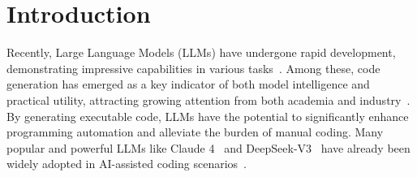 \section{Introduction}
\label{sec:intro}





Recently, Large Language Models (LLMs) have undergone rapid development, demonstrating impressive capabilities in various tasks~\citep{gpt4o,gemini2.5,deepseekai2025deepseekr1,tencenthunyuanteam2025hunyuanturbos}. Among these, code generation has emerged as a key indicator of both model intelligence and practical utility, attracting growing attention from both academia and industry~\citep{chen2021evaluatinglargelanguagemodels,jimenez2024swebench,jiang2024surveylargelanguagemodels}. By generating executable code, LLMs have the potential to significantly enhance programming automation and alleviate the burden of manual coding. Many popular and powerful LLMs like Claude 4~\citep{claude4} and DeepSeek-V3~\citep{deepseek_v3} have already been widely adopted in AI-assisted coding scenarios~\citep{Cursor}.



